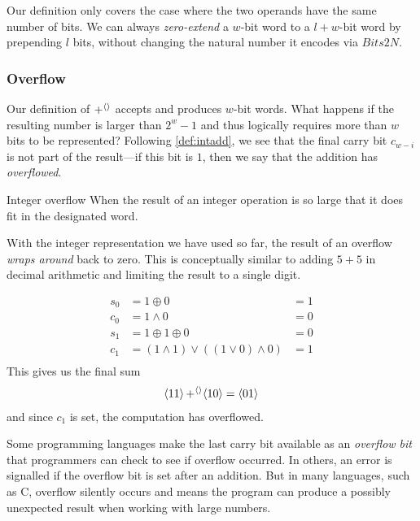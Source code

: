 Our definition only covers the case where the two operands have the
same number of bits.  We can always \emph{zero-extend} a $w$-bit word
to a $l+w$-bit word by prepending $l$ bits, without changing the
natural number it encodes via $Bits2N$.

\subsubsection{Overflow}

Our definition of $\operatorname{+^{\langle\rangle}}$ accepts and produces $w$-bit words.  What
happens if the resulting number is larger than $2^{w}-1$ and thus
logically requires more than $w$ bits to be represented?  Following
\cref{def:intadd}, we see that the final carry bit $c_{w-i}$ is not
part of the result---if this bit is $1$, then we say that the addition
has \emph{overflowed}.

\begin{definition}{Integer overflow}
  When the result of an integer operation is so large that it does fit
  in the designated word.
\end{definition}

With the integer representation we have used so far, the result of an
overflow \emph{wraps around} back to zero.  This is conceptually
similar to adding $5+5$ in decimal arithmetic and limiting the result
to a single digit.

\begin{example}
  \begin{align*}
    s_{0} &= 1 \oplus 0 &= 1 \\
    c_{0} &= 1 \land 0 &= 0 \\
    s_{1} &= 1 \oplus 1 \oplus 0 &= 0 \\
    c_{1} &= (1 \land 1) \lor ((1\lor 0) \land 0) &= 1 \\
  \end{align*}
  This gives us the final sum
  \begin{align*}
    \langle 11 \rangle \operatorname{+^{\langle\rangle}} \langle 10 \rangle = \langle 01 \rangle
  \end{align*}
  and since $c_{1}$ is set, the computation has overflowed.
\end{example}

Some programming languages make the last carry bit available as an
\emph{overflow bit} that programmers can check to see if overflow
occurred.  In others, an error is signalled if the overflow bit is set
after an addition.  But in many languages, such as C, overflow
silently occurs and means the program can produce a possibly
unexpected result when working with large numbers.


